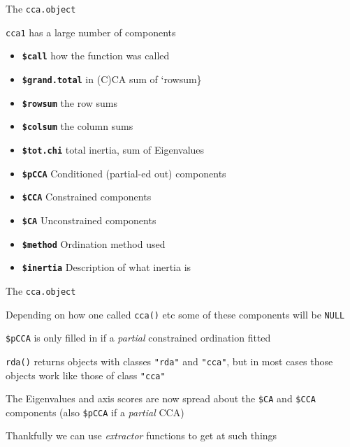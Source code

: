 \documentclass[10pt,ignorenonframetext,compress, aspectratio=169]{beamer}
\begin{document}
\begin{frame}{The \texttt{cca.object}}

\texttt{cca1} has a large number of components

\begin{itemize}
\itemsep1pt\parskip0pt
\item
  \textbf{\texttt{\$call}} how the function was called
\item
  \textbf{\texttt{\$grand.total}} in (C)CA sum of `rowsum\}
\item
  \textbf{\texttt{\$rowsum}} the row sums
\item
  \textbf{\texttt{\$colsum}} the column sums
\item
  \textbf{\texttt{\$tot.chi}} total inertia, sum of Eigenvalues
\item
  \textbf{\texttt{\$pCCA}} Conditioned (partial-ed out) components
\item
  \textbf{\texttt{\$CCA}} Constrained components
\item
  \textbf{\texttt{\$CA}} Unconstrained components
\item
  \textbf{\texttt{\$method}} Ordination method used
\item
  \textbf{\texttt{\$inertia}} Description of what inertia is
\end{itemize}

\end{frame}

\begin{frame}{The \texttt{cca.object}}

Depending on how one called \texttt{cca()} etc some of these components
will be \texttt{NULL}

\texttt{\$pCCA} is only filled in if a \emph{partial} constrained
ordination fitted

\texttt{rda()} returns objects with classes \texttt{"rda"} and
\texttt{"cca"}, but in most cases those objects work like those of class
\texttt{"cca"}

The Eigenvalues and axis scores are now spread about the \texttt{\$CA}
and \texttt{\$CCA} components (also \texttt{\$pCCA} if a \emph{partial}
CCA)

Thankfully we can use \emph{extractor} functions to get at such things

\end{frame}
\end{document}
